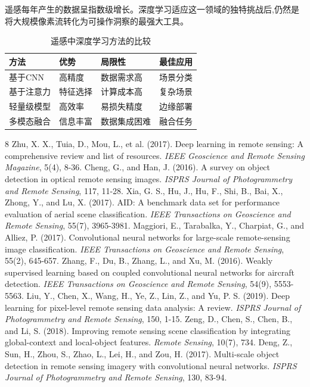 \documentclass[12pt,a4paper]{article}
\begin{document}
遥感每年产生的数据呈指数级增长。深度学习适应这一领域的独特挑战后,仍然是将大规模像素流转化为可操作洞察的最强大工具。

\begin{table}[htbp]
\centering
\caption{遥感中深度学习方法的比较}
\label{tab:comparison}
\begin{tabular}{@{}llll@{}}
\toprule
\textbf{方法} & \textbf{优势} & \textbf{局限性} & \textbf{最佳应用} \\
\midrule
基于CNN & 高精度 & 数据需求高 & 场景分类 \\
基于注意力 & 特征选择 & 计算成本高 & 复杂场景 \\
轻量级模型 & 高效率 & 易损失精度 & 边缘部署 \\
多模态融合 & 信息丰富 & 数据集成困难 & 融合任务 \\
\bottomrule
\end{tabular}
\end{table}


\begin{thebibliography}{8}
 Zhu, X. X., Tuia, D., Mou, L., et al. (2017). Deep learning in remote sensing: A comprehensive review and list of resources. \emph{IEEE Geoscience and Remote Sensing Magazine}, 5(4), 8-36.
 Cheng, G., and Han, J. (2016). A survey on object detection in optical remote sensing images. \emph{ISPRS Journal of Photogrammetry and Remote Sensing}, 117, 11-28.
 Xia, G. S., Hu, J., Hu, F., Shi, B., Bai, X., Zhong, Y., and Lu, X. (2017). AID: A benchmark data set for performance evaluation of aerial scene classification. \emph{IEEE Transactions on Geoscience and Remote Sensing}, 55(7), 3965-3981.
 Maggiori, E., Tarabalka, Y., Charpiat, G., and Alliez, P. (2017). Convolutional neural networks for large-scale remote-sensing image classification. \emph{IEEE Transactions on Geoscience and Remote Sensing}, 55(2), 645-657.
 Zhang, F., Du, B., Zhang, L., and Xu, M. (2016). Weakly supervised learning based on coupled convolutional neural networks for aircraft detection. \emph{IEEE Transactions on Geoscience and Remote Sensing}, 54(9), 5553-5563.
 Liu, Y., Chen, X., Wang, H., Ye, Z., Lin, Z., and Yu, P. S. (2019). Deep learning for pixel-level remote sensing data analysis: A review. \emph{ISPRS Journal of Photogrammetry and Remote Sensing}, 150, 1-15.
 Zeng, D., Chen, S., Chen, B., and Li, S. (2018). Improving remote sensing scene classification by integrating global-context and local-object features. \emph{Remote Sensing}, 10(7), 734.
 Deng, Z., Sun, H., Zhou, S., Zhao, L., Lei, H., and Zou, H. (2017). Multi-scale object detection in remote sensing imagery with convolutional neural networks. \emph{ISPRS Journal of Photogrammetry and Remote Sensing}, 130, 83-94.
\end{thebibliography}
\end{document}
